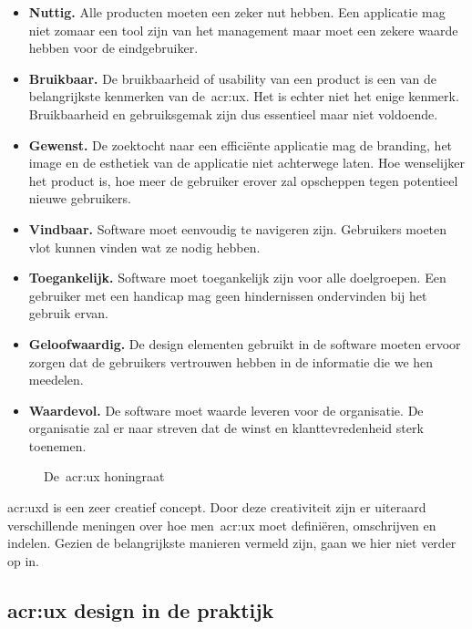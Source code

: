 \begin{itemize}
    \item \textbf{Nuttig.}
    Alle producten moeten een zeker nut hebben. Een applicatie mag niet zomaar een tool zijn van het management maar moet een zekere waarde hebben voor de eindgebruiker.
    \item \textbf{Bruikbaar.}
    De bruikbaarheid of usability van een product is een van de belangrijkste kenmerken van de~\acrlong{acr:ux}. Het is echter niet het enige kenmerk. Bruikbaarheid en gebruiksgemak zijn dus essentieel maar niet voldoende.
    \item \textbf{Gewenst.}
    De zoektocht naar een efficiënte applicatie mag de branding, het image en de esthetiek van de applicatie niet achterwege laten. Hoe wenselijker het product is, hoe meer de gebruiker erover zal opscheppen tegen potentieel nieuwe gebruikers.
    \item \textbf{Vindbaar.}
    Software moet eenvoudig te navigeren zijn. Gebruikers moeten vlot kunnen vinden wat ze nodig hebben.
    \item \textbf{Toegankelijk.}
    Software moet toegankelijk zijn voor alle doelgroepen. Een gebruiker met een handicap mag geen hindernissen ondervinden bij het gebruik ervan.
    \item \textbf{Geloofwaardig.}
    De design elementen gebruikt in de software moeten ervoor zorgen dat de gebruikers vertrouwen hebben in de informatie die we hen meedelen.
    \item \textbf{Waardevol.}
    De software moet waarde leveren voor de organisatie. De organisatie zal er naar streven dat de winst en klanttevredenheid sterk toenemen.
\end{itemize}

\begin{figure}
    \centering
    \def\svgwidth{.8\columnwidth}
    
    \caption{De~\acrlong{acr:ux} honingraat}
    \label{fig:ux-facets}
\end{figure}

\acrlong{acr:uxd} is een zeer creatief concept. Door deze creativiteit zijn er uiteraard verschillende meningen over hoe men~\acrlong{acr:ux} moet definiëren, omschrijven en indelen. Gezien de belangrijkste manieren vermeld zijn, gaan we hier niet verder op in.

\subsection{\acrlong{acr:ux} design in de praktijk}
\label{sec:user-experience-in-software:user-experience-design-in-de-praktijk}

